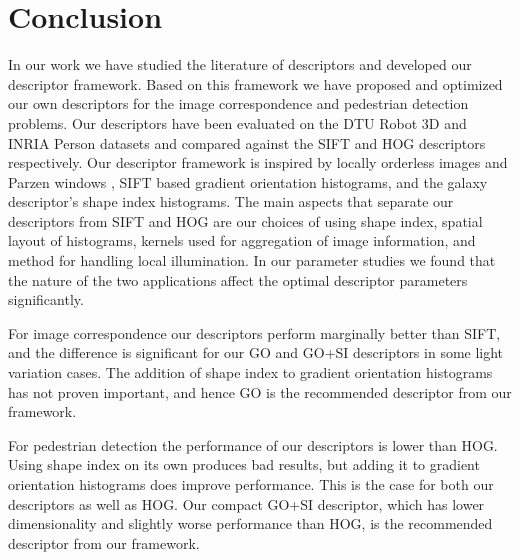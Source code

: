 \documentclass[thesis.tex]{subfiles}
\begin{document}
\chapter{Conclusion}

In our work we have studied the literature of descriptors and developed our descriptor framework. Based on this framework we have proposed and optimized our own descriptors for the image correspondence and pedestrian detection problems. Our descriptors have been evaluated on the DTU Robot 3D and INRIA Person datasets and compared against the SIFT \cite{lowe2004distinctive} and HOG \cite{felzenszwalb2009object} descriptors respectively.
Our descriptor framework is inspired by locally orderless images \cite{koenderink1999structure} and Parzen windows \cite{parzen1962estimation}, SIFT based gradient orientation histograms, and the galaxy descriptor's \cite{pedersen2013shape} shape index histograms. The main aspects that separate our descriptors from SIFT and HOG are our choices of using shape index, spatial layout of histograms, kernels used for aggregation of image information, and method for handling local illumination. In our parameter studies we found that the nature of the two applications affect the optimal descriptor parameters significantly.

For image correspondence our descriptors perform marginally better than SIFT, and the difference is significant for our GO and GO+SI descriptors in some light variation cases. The addition of shape index to gradient orientation histograms has not proven important, and hence GO is the recommended descriptor from our framework.

For pedestrian detection the performance of our descriptors is lower than HOG. Using shape index on its own produces bad results, but adding it to gradient orientation histograms does improve performance. This is the case for both our descriptors as well as HOG. Our compact GO+SI descriptor, which has lower dimensionality and slightly worse performance than HOG, is the recommended descriptor from our framework.

\subbibliography
\end{document}
